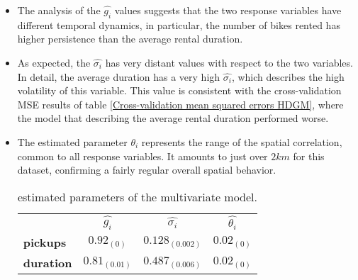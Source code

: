 \begin{itemize}
	\item The analysis of the $\hat{g_i}$ values suggests that the two response variables have different temporal dynamics, in particular, the number of bikes rented has higher persistence than the average rental duration. 
	\item As expected, the $\hat{\sigma_i}$ has very distant values with respect to the two variables. In detail, the average duration has a very high $\hat{\sigma_i}$, which describes the high volatility of this variable. This value is consistent with the cross-validation MSE results of table \ref{Cross-validation mean squared errors HDGM}, where the model that describing the average rental duration performed worse.
	\item  The estimated parameter $\theta_i$ represents the range of the spatial correlation, common to all response variables. It amounts to just over $2 km$ for this dataset, confirming a fairly regular overall spatial behavior.
	\begin{table}[h!]
		\centering
		\renewcommand\arraystretch{1.3}
		\begin{tabular}{|cccc}
			\hline
			& $\hat{g_i}$  & $\hat{\sigma_i}$ & $\hat{\theta_i}$  \\ \cline{2-4} 
			\multicolumn{1}{|l|}{\textbf{pickups}}  &  $0.92_{(0)}$ &  $0.128_{(0.002)}$ & \multicolumn{1}{c}{$0.02_{(0)}$ } \\
			\multicolumn{1}{|l|}{\textbf{duration}} &  $0.81_{(0.01)}$ &  $0.487_{(0.006)}$ &     $0.02_{(0)}$                              
		\end{tabular}
		\caption[Estimated parameters of the multivariate model (HDGM)]{estimated parameters of the multivariate model.}
		\label{Bivariate Param_HDGM}
	\end{table}
\end{itemize}